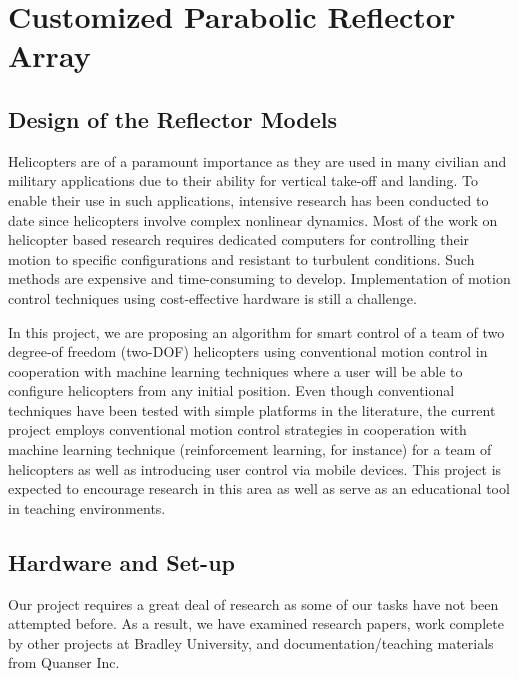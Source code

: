 \chapter{Customized Parabolic Reflector Array}
\label{ch: Chapter3}

\section{Design of the Reflector Models}
Helicopters are of a paramount importance as
they are used in many civilian and military applications due to their ability for vertical take-off and landing. To enable their use in such applications, intensive research has been conducted to date since helicopters involve complex nonlinear dynamics. Most of the work on helicopter based research requires dedicated computers for controlling their motion to specific configurations and resistant to turbulent conditions. Such methods are expensive and time-consuming to develop. Implementation of motion control techniques using cost-effective hardware is still a challenge.

In this project, we are proposing an algorithm for smart control of a team of two degree-of freedom (two-DOF) helicopters using conventional motion control in cooperation with machine learning techniques where a user will be able to configure helicopters from any initial position. Even though conventional techniques have been tested with simple platforms in the literature, the current project employs conventional motion control strategies in cooperation with machine learning technique (reinforcement learning, for instance) for a team of helicopters as well as introducing user control via mobile devices. This project is expected to encourage research in this area as well as serve as an educational tool in teaching environments.


\section{Hardware and Set-up}
Our project requires a great deal of research as some of our tasks have not been attempted before.  As a result, we have examined research papers, work complete by other projects at Bradley University, and documentation/teaching materials from Quanser Inc.

